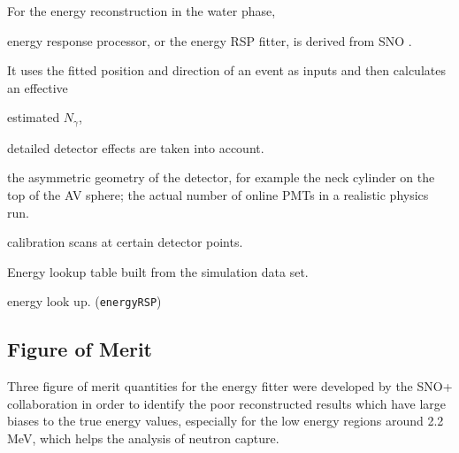 For the energy reconstruction in the water phase,  

energy response processor, or the energy RSP fitter, is derived from SNO \cite{boulay2004direct,moffat2001optical}.

It uses the fitted position and direction of an event as inputs and then calculates an effective 

estimated $N_\gamma$,

detailed detector effects are taken into account.

the asymmetric geometry of the detector, for example the neck cylinder on the top of the AV sphere; the actual number of online PMTs in a realistic physics run.

 calibration scans at certain detector points.

Energy lookup table built from the simulation data set.

energy look up\cite{energyRSP}.
(\texttt{energyRSP})

%	
%	


\subsection{Figure of Merit}\label{sect:energy_fom}
Three figure of merit quantities for the energy fitter were developed by the SNO+ collaboration in order to identify the poor reconstructed results which have large biases to the true energy values, especially for the low energy regions around 2.2 MeV, which helps the analysis of neutron capture\cite{waterunidoc}.

